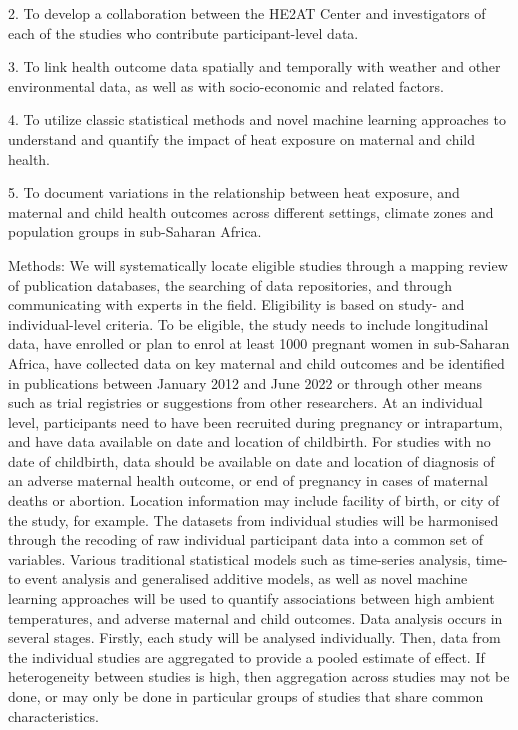 \documentclass[12pt,letterpaper]{article}
\begin{document}
2.	To develop a collaboration between the HE2AT Center and investigators of each of the studies who contribute participant-level data.

3.	To link health outcome data spatially and temporally with weather and other environmental data, as well as with socio-economic and related factors.

4.	To utilize classic statistical methods and novel machine learning approaches to understand and quantify the impact of heat exposure on maternal and child health.

5.	To document variations in the relationship between heat exposure, and maternal and child health outcomes across different settings, climate zones and population groups in sub-Saharan Africa.

Methods: We will systematically locate eligible studies through a mapping review of publication databases, the searching of data repositories, and through communicating with experts in the field. Eligibility is based on study- and individual-level criteria. To be eligible, the study needs to include longitudinal data, have enrolled or plan to enrol at least 1000 pregnant women in sub-Saharan Africa, have collected data on key maternal and child outcomes and be identified in publications between January 2012 and June 2022 or through other means such as trial registries or suggestions from other researchers. At an individual level, participants need to have been recruited during pregnancy or intrapartum, and have data available on date and location of childbirth. For studies with no date of childbirth, data should be available on date and location of diagnosis of an adverse maternal health outcome, or end of pregnancy in cases of maternal deaths or abortion. Location information may include facility of birth, or city of the study, for example. The datasets from individual studies will be harmonised through the recoding of raw individual participant data into a common set of variables. Various traditional statistical models such as time-series analysis, time-to event analysis and generalised additive models, as well as novel machine learning approaches will be used to quantify associations between high ambient temperatures, and adverse maternal and child outcomes. Data analysis occurs in several stages. Firstly, each study will be analysed individually. Then, data from the individual studies are aggregated to provide a pooled estimate of effect. If heterogeneity between studies is high, then aggregation across studies may not be done, or may only be done in particular groups of studies that share common characteristics.
\end{document}
